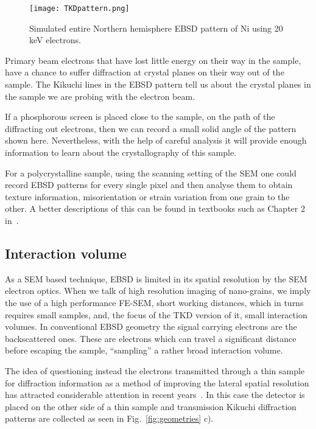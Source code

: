\begin{figure}[ht]
\centering
\texttt{[image: TKDpattern.png]}
\caption[EBSD pattern of Ni northern hemisphere.]{Simulated entire Northern hemisphere  EBSD pattern of Ni using 20 keV electrons.}
\label{fig:tkspatter}
\end{figure}


Primary beam electrons that have lost little energy on their way in the sample, have a chance to suffer diffraction at crystal planes on their way out of the sample. The Kikuchi lines in the EBSD pattern tell us about the crystal planes in the sample we are probing with the electron beam. 


 If a phosphorous screen is placed close to the sample, on the path of the diffracting out electrons, then we can record a small solid angle of the pattern shown here. Nevertheless, with the help of careful analysis it will provide enough information to learn about the crystallography of this sample. 
 
 For a polycrystalline sample, using the scanning setting of the SEM one could record  EBSD patterns for every single pixel and then analyse them to obtain texture information, misorientation or strain variation from one grain to the other.   A better descriptions of this can be found in textbooks such as Chapter 2 in~\cite{Maitland07}.


\pagebreak

\subsection{Interaction volume}

As a SEM based technique, EBSD is limited in its spatial resolution by the SEM electron optics. When we talk of high resolution imaging of nano-grains, we imply the use of a high performance FE-SEM, short working distances, which in turns requires small samples, and, the focus of the TKD version of it, small interaction volumes. In conventional EBSD geometry the signal carrying electrons are the backscattered ones. These are electrons which can travel a significant distance before escaping the sample, ``sampling'' a rather broad interaction volume. 


The idea of questioning instead the electrons transmitted through a thin sample for diffraction information as a method of improving the lateral spatial resolution has attracted considerable attention in recent years~\cite{trimby2012,Keller12}. In this case the detector is placed on the other side of a thin sample and transmission Kikuchi diffraction patterns are collected as seen in Fig.~\ref{fig:geometries} c).

